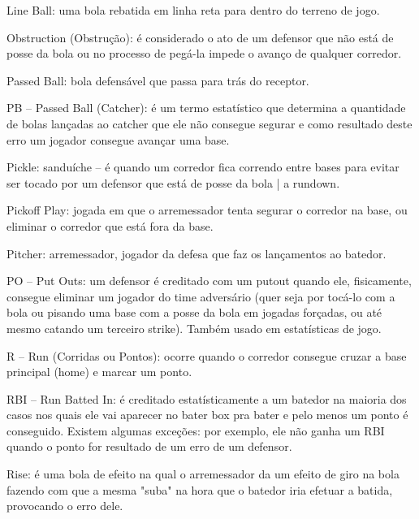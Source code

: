 
Line Ball: uma bola rebatida em linha reta para dentro do terreno de jogo.

Obstruction (Obstrução): é considerado o ato de um defensor que não está de posse da bola ou no processo de pegá-la impede o avanço de qualquer corredor.

Passed Ball: bola defensável que passa para trás do receptor.

PB -- Passed Ball (Catcher): é um termo estatístico que determina a quantidade de bolas lançadas ao catcher que ele não consegue segurar e como resultado deste erro um jogador consegue avançar uma base.

Pickle: sanduíche -- é quando um corredor fica correndo entre bases para evitar ser tocado por um defensor que está de posse da bola | a rundown.

Pickoff Play: jogada em que o arremessador tenta segurar o corredor na base, ou eliminar o corredor que está fora da base.

Pitcher: arremessador, jogador da defesa que faz os lançamentos ao batedor.

PO -- Put Outs: um defensor é creditado com um \gls{putout} quando ele, fisicamente, consegue eliminar um jogador do time adversário (quer seja por
tocá-lo com a bola ou pisando uma base com a posse da bola em jogadas forçadas, ou até mesmo catando um terceiro strike). Também usado em
estatísticas de jogo.

R -- Run (Corridas ou Pontos): ocorre quando o corredor consegue cruzar a base principal (home) e marcar um ponto.

RBI -- Run Batted In: é creditado estatísticamente a um batedor na maioria dos casos nos quais ele vai aparecer no bater box pra bater e pelo menos um ponto é conseguido. Existem algumas exceções: por exemplo, ele não ganha um RBI quando o ponto for resultado de um erro de um defensor.

Rise: é uma bola de efeito na qual o arremessador da um efeito de giro na bola fazendo com que a mesma "suba" na hora que o batedor iria efetuar a batida, provocando o erro dele.



